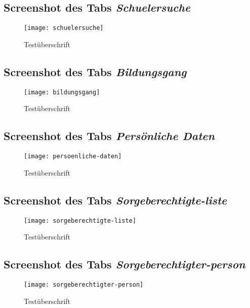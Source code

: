 \begin{landscape}
\subsection{Screenshot des Tabs \textit{Schuelersuche}}
\label{section-schuelersuche}
\begin{figure}[H]
    \centering
    \caption{Testüberschrift}
    \begin{adjustbox}{width=\linewidth, center}
        \texttt{[image: schuelersuche]}
    \end{adjustbox}
\end{figure}

\subsection{Screenshot des Tabs \textit{Bildungsgang}}
\label{section-bildungsgang}
\begin{figure}[H]
    \centering
    \caption{Testüberschrift}
    \begin{adjustbox}{width=\linewidth, center}
        \texttt{[image: bildungsgang]}
    \end{adjustbox}
\end{figure}

\subsection{Screenshot des Tabs \textit{Persönliche Daten}}
\label{section-persoenliche-daten}
\begin{figure}[H]
    \centering
    \caption{Testüberschrift}
    \begin{adjustbox}{width=\linewidth, center}
        \texttt{[image: persoenliche-daten]}
    \end{adjustbox}
\end{figure}

\subsection{Screenshot des Tabs \textit{Sorgeberechtigte-liste}}
\label{section-sorgeberechtigte-liste}
\begin{figure}[H]
    \centering
    \caption{Testüberschrift}
    \begin{adjustbox}{width=\linewidth, center}
        \texttt{[image: sorgeberechtigte-liste]}
    \end{adjustbox}
\end{figure}

\subsection{Screenshot des Tabs \textit{Sorgeberechtigter-person}}
\label{section-sorgeberechtigter-person}
\begin{figure}[H]
    \centering
    \caption{Testüberschrift}
    \begin{adjustbox}{width=0.5\linewidth, center}
        \texttt{[image: sorgeberechtigter-person]}
    \end{adjustbox}
\end{figure}


\end{landscape}
